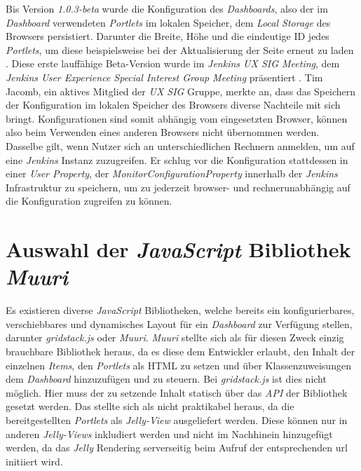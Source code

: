 Bis Version \textit{1.0.3-beta} wurde die Konfiguration des \textit{Dashboards}, also der im \textit{Dashboard} verwendeten \textit{Portlets} im lokalen Speicher, dem \textit{Local Storage} des Browsers persistiert. Darunter die Breite, Höhe und die eindeutige ID jedes \textit{Portlets}, um diese beispielsweise bei der Aktualisierung der Seite erneut zu laden \citep{pull-request-monitoring-plugin}. Diese erste lauffähige Beta-Version wurde im \textit{Jenkins UX SIG Meeting}, dem \textit{Jenkins User Experience Special Interest Group Meeting} präsentiert \citep{yt}. Tim Jacomb, ein aktives Mitglied der \textit{UX SIG} Gruppe, merkte an, dass das Speichern der Konfiguration im lokalen Speicher des Browsers diverse Nachteile mit sich bringt. Konfigurationen sind somit abhängig vom eingesetzten Browser, können also beim Verwenden eines anderen Browsers nicht übernommen werden. Dasselbe gilt, wenn Nutzer sich an unterschiedlichen Rechnern anmelden, um auf eine \textit{Jenkins} Instanz zuzugreifen. Er schlug vor die Konfiguration stattdessen in einer \textit{User Property}, der \textit{MonitorConfigurationProperty} innerhalb der \textit{Jenkins} Infrastruktur zu speichern, um zu jederzeit browser- und rechnerunabhängig auf die Konfiguration zugreifen zu können. 
 
\section{Auswahl der \textit{JavaScript} Bibliothek \textit{Muuri}}

Es existieren diverse \textit{JavaScript} Bibliotheken, welche bereits ein konfigurierbares, verschiebbares und dynamisches Layout für ein \textit{Dashboard} zur Verfügung stellen, darunter \textit{gridstack.js} \citep{gridstack} oder \textit{Muuri}. \textit{Muuri} stellte sich als für diesen Zweck einzig brauchbare Bibliothek heraus, da es diese dem Entwickler erlaubt, den Inhalt der einzelnen \textit{Items}, den \textit{Portlets} als HTML zu setzen und über Klassenzuweisungen dem \textit{Dashboard} hinzuzufügen und zu steuern.
Bei \textit{gridstack.js} ist dies nicht möglich. Hier muss der zu setzende Inhalt statisch über das \textit{API} der Bibliothek gesetzt werden. Das stellte sich als nicht praktikabel heraus, da die bereitgestellten \textit{Portlets} als \textit{Jelly-View} ausgeliefert werden. Diese können nur in anderen \textit{Jelly-Views} inkludiert werden und nicht im Nachhinein hinzugefügt werden, da das \textit{Jelly} Rendering serverseitig beim Aufruf der entsprechenden \ac{url} initiiert wird.

